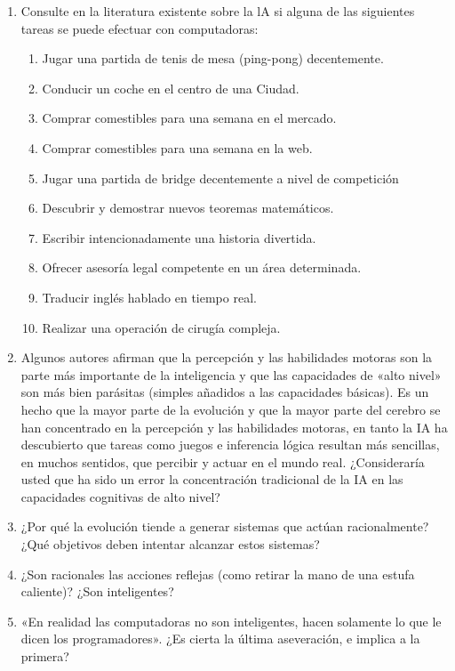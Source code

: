 \documentclass[spanish,11pt,twoside]{article}
\begin{document}
\begin{enumerate}
\item Consulte en la literatura existente sobre la lA si alguna de las siguientes tareas se puede efectuar con computadoras:
\begin{enumerate}
\item Jugar una partida de tenis de mesa (ping-pong) decentemente.
\item Conducir un coche en el centro de una Ciudad.
\item Comprar comestibles para una semana en el mercado.
\item Comprar comestibles para una semana en la web.
\item Jugar una partida de bridge decentemente a nivel de competición
\item Descubrir y demostrar nuevos teoremas matemáticos.
\item Escribir intencionadamente una historia divertida.
\item Ofrecer asesoría legal competente en un área determinada.
\item Traducir inglés hablado en tiempo real.
\item Realizar una operación de cirugía compleja.
\end{enumerate}


\item Algunos autores afirman que la percepción y las habilidades motoras son la parte más importante de la inteligencia y que las capacidades de «alto nivel» son más bien parásitas (simples añadidos a las capacidades básicas). Es un hecho que la mayor parte de la evolución y que la mayor parte del cerebro se han concentrado en la percepción y las habilidades motoras, en tanto la IA ha descubierto que tareas como juegos e inferencia lógica resultan más sencillas, en muchos sentidos, que percibir y actuar en el mundo real. ¿Consideraría usted que ha sido un error la concentración tradicional de la IA en las capacidades cognitivas de alto nivel?

\item ¿Por qué la evolución tiende a generar sistemas que actúan racionalmente? ¿Qué objetivos deben intentar alcanzar estos sistemas?

\item ¿Son racionales las acciones reflejas (como retirar la mano de una estufa caliente)? ¿Son inteligentes?

\item «En realidad las computadoras no son inteligentes, hacen solamente lo que le dicen los programadores». ¿Es cierta la última aseveración, e implica a la primera?


\end{enumerate}
\end{document}
